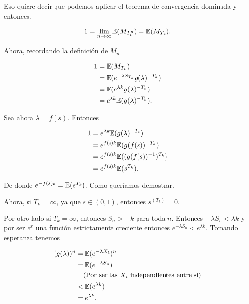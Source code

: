     Eso quiere decir que podemos aplicar el teorema de convergencia dominada y entonces.
    
    \begin{align}
        1 = \lim_{n \rightarrow \infty} \mathbb{E}(M_{T_k^n}) = \mathbb{E}(M_{T_k}).
    \end{align}\par\null
        
    Ahora, recordando la definición de $M_n$
    
    \begin{align}
       1    &=  \mathbb{E}(M_{T_k})                                 \\
            &=  \mathbb{E}(e^{-\lambda S_{T_k}} g(\lambda)^{-T_k})  \\
            &=  \mathbb{E}(e^{\lambda k} g(\lambda)^{-T_k})         \\
            &=  e^{\lambda k} \mathbb{E}(g(\lambda)^{-T_k}).        
    \end{align}\par\null
    
    Sea ahora $\lambda = f(s)$. Entonces
    
    \begin{align}
        1   &=  e^{\lambda k} \mathbb{E}(g(\lambda)^{-T_k})        \\
            &=  e^{f(s) k} \mathbb{E}(g(f(s))^{-T_k})              \\
            &=  e^{f(s) k} \mathbb{E}((g(f(s))^{-1})^{T_k})        \\            
            &=  e^{f(s) k} \mathbb{E}(s^{T_k}).                 
    \end{align}\par\null
    
    De donde $e^{-f(s) k} = \mathbb{E}(s^{T_k})$. Como queríamos demostrar.\par\null
    
    Ahora, si $T_k = \infty$, ya que $s \in (0,1)$, entonces $s^(T_k) = 0$.\par\null
    
    Por otro lado si $T_k = \infty$, entonces $S_n > -k$ para toda $n$. Entonces
    $-\lambda S_n < \lambda k$ y por ser $e^x$ una función estrictamente creciente entonces
    $e^{-\lambda S_n} < e^{\lambda k}$. Tomando esperanza tenemos
    
    \begin{align}
            (g(\lambda))^n      &=  \mathbb{E}(e^{-\lambda X_1})^{n}                                    \\ 
                                &=  \mathbb{E}(e^{-\lambda S_n})                                        \\
                                &\;\;\;\;\mbox{(Por ser las $X_i$ independientes entre sí)}     		\\
                                &<  \mathbb{E}(e^{\lambda k})                                           \\
                                &=   e^{\lambda k}.
    \end{align}\par\null
    
